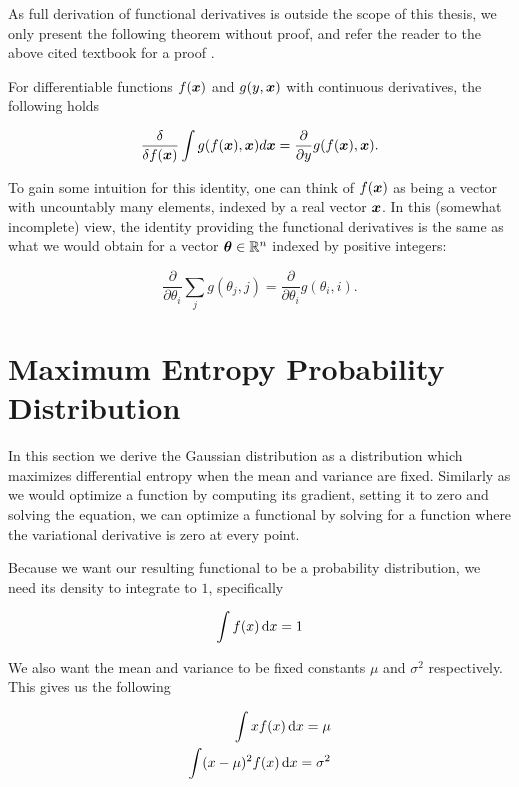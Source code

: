 As full derivation of functional derivatives is outside the scope of this
thesis, we only present the following theorem without proof, and refer the
reader to the above cited textbook for a proof .

For differentiable functions $f({\bm{x}})$ and $g(y, {\bm{x}})$ with continuous
derivatives, the following holds

\begin{equation}
  \frac{\delta}{\delta f({\bm{x}})} \int g(f({\bm{x}}), {\bm{x}}) d {\bm{x}} = \frac{\partial}{\partial y} g(f({\bm{x}}), {\bm{x}}).
\end{equation}

 To gain some intuition for this identity,
one can think of $f({\bm{x}})$ as being a vector with uncountably many elements,
indexed by a real vector ${\bm{x}}$. In this (somewhat incomplete) view, the
identity providing the functional derivatives is the same as what we would
obtain for a vector ${\bm{\theta}} \in {\mathbb{R}}^n$ indexed by positive integers:

\begin{equation}
  \frac{\partial}{\partial \theta_i} \sum_j g(\theta_j, j) = \frac{\partial}{\partial \theta_i} g(\theta_i, i).
\end{equation}

\section{Maximum Entropy Probability Distribution}

In this section we derive the Gaussian distribution as a distribution which
maximizes differential entropy when the mean and variance are fixed. Similarly
as we would optimize a function by computing its gradient, setting it to zero
and solving the equation, we can optimize a functional by solving for a
function where the variational derivative is zero at every point.

Because we want our resulting functional to be a probability distribution, we
need its density to integrate to $1$, specifically

\begin{equation}
  \int f(x) \mathop{}\!\mathrm{d} x = 1
\end{equation}

We also want the mean and variance to be fixed constants $\mu$ and $\sigma^2$
respectively. This gives us the following

\begin{align}
  \int x f(x) \mathop{}\!\mathrm{d} x = \mu \\
  \int (x - \mu) ^2 f(x) \mathop{}\!\mathrm{d} x = \sigma^2
\end{align}

